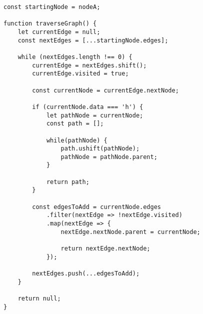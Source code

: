 \documentclass[../article.tex]{subfiles}
\begin{document}
\begin{figure*}[h]
    \begin{ruledelement}
        \begin{lstlisting}[caption={Простой поиск кратчайшего пути}, label={lst:bfsShortesPath}]
const startingNode = nodeA;

function traverseGraph() {
    let currentEdge = null;
    const nextEdges = [...startingNode.edges];

    while (nextEdges.length !== 0) {
        currentEdge = nextEdges.shift();
        currentEdge.visited = true;

        const currentNode = currentEdge.nextNode;

        if (currentNode.data === 'h') {
            let pathNode = currentNode;
            const path = [];

            while(pathNode) {
                path.ushift(pathNode);
                pathNode = pathNode.parent;
            }

            return path;
        }

        const edgesToAdd = currentNode.edges
            .filter(nextEdge => !nextEdge.visited)
            .map(nextEdge => {
                nextEdge.nextNode.parent = currentNode;

                return nextEdge.nextNode;
            });

        nextEdges.push(...edgesToAdd);
    }

    return null;
}
        \end{lstlisting}
    \end{ruledelement}

\end{figure*}
\end{document}
